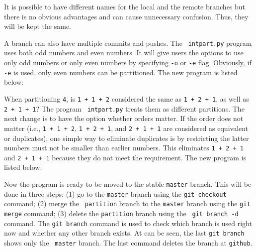 It is possible to have different names for the local and the remote
branches but there is no obvious advantages and can cause unnecessary
confusion.  Thus, they will be kept the same.

A branch can also have multiple commits and pushes. The {\tt
  intpart.py} program uses both odd numbers and even numbers. It will
give users the options to use only odd numbers or only even numbers by
specifying {\tt -o} or {\tt -e} flag. Obviously, if {\tt -e} is used,
only even numbers can be partitioned. The new program is listed below:

\resetlinenumber[1]
\linenumbers
\begin{tt}
  
\end{tt}
\nolinenumbers

When partitioning {\tt 4}, is {\tt 1 + 1 + 2} considered the same as
{\tt 1 + 2 + 1}, as well as {\tt 2 + 1 + 1}? The program {\tt
  intpart.py} treats them as different partitions.  The next change is
to have the option whether orders matter. If the order does not matter
(i.e., {\tt 1 + 1 + 2}, {\tt 1 + 2 + 1}, and {\tt 2 + 1 + 1} are
considered as equivalent or duplicates), one simple way to eliminate
duplicates is by restricting the latter numbers must not be smaller
than earlier numbers.  This eliminates {\tt 1 + 2 + 1} and {\tt 2 + 1
  + 1} because they do not meet the requirement.
The new program is listed below:

\resetlinenumber[1]
\linenumbers
\begin{tt}
  
\end{tt}
\nolinenumbers


  
Now the program is ready to be moved to the stable {\tt master}
branch.  This will be done in three steps: (1) go to the {\tt master}
branch using the {\tt git checkout} command; (2) merge the {\tt
  partition} branch to the {\tt master} branch using the {\tt git
  merge} command; (3) delete the {\tt partition} branch using the {\tt
  git branch -d} command.  The {\tt git branch} command is used to
check which branch is used right now and whether any other branch
exists.  At can be seen, the last {\tt git branch} shows only the {\tt
  master} branch.  The last command deletes the branch at {\tt github}.

